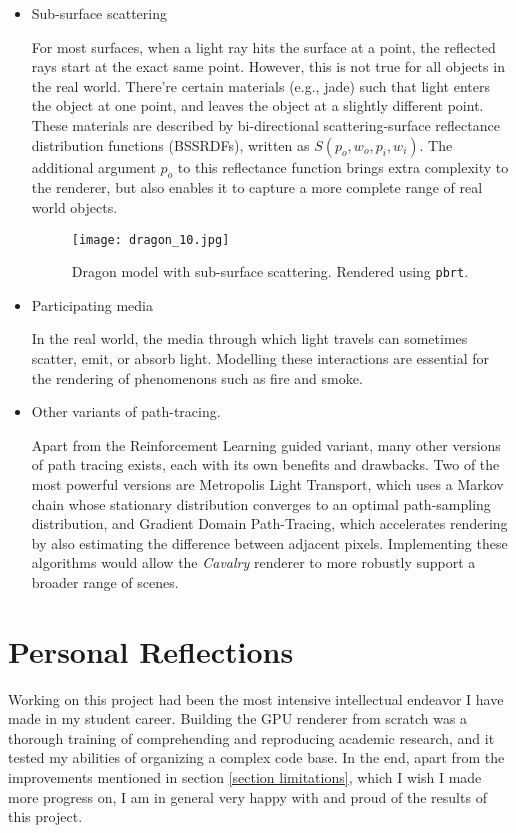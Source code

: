 \begin{itemize}

    \item Sub-surface scattering
    
    For most surfaces, when a light ray hits the surface at a point, the reflected rays start at the exact same point. However, this is not true for all objects in the real world. There're certain materials (e.g., jade) such that light enters the object at one point, and leaves the object at a slightly different point. These materials are described by bi-directional scattering-surface reflectance distribution functions (BSSRDFs), written as $S(p_o,w_o,p_i,w_i)$. The additional argument $p_o$ to this reflectance function brings extra complexity to the renderer, but also enables it to capture a more complete range of real world objects.

    \begin{figure}[H]
        \centering
        \texttt{[image: dragon\_10.jpg]}
        \caption{Dragon model with sub-surface scattering. Rendered using \texttt{pbrt}.}
    \end{figure}

    \item Participating media
    
    In the real world, the media through which light travels can sometimes scatter, emit, or absorb light. Modelling these interactions are essential for the rendering of phenomenons such as fire and smoke. 

    

    \item Other variants of path-tracing.
    
    Apart from the Reinforcement Learning guided variant, many other versions of path tracing exists, each with its own benefits and drawbacks. Two of the most powerful versions are Metropolis Light Transport, which uses a Markov chain whose stationary distribution converges to an optimal path-sampling distribution, and Gradient Domain Path-Tracing, which accelerates rendering by also estimating the difference between adjacent pixels. Implementing these algorithms would allow the \textit{Cavalry} renderer to more robustly support a broader range of scenes.


\end{itemize}


\section{Personal Reflections}
Working on this project had been the most intensive intellectual endeavor I have made in my student career. Building the GPU renderer from scratch was a thorough training of comprehending and reproducing academic research, and it tested my abilities of organizing a complex code base. In the end, apart from the improvements mentioned in section \ref{section limitations}, which I wish I made more progress on, I am in general very happy with and proud of the results of this project.

